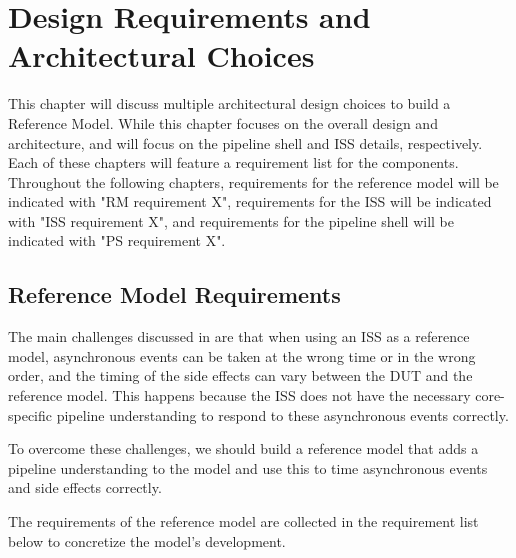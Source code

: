 \chapter{Design Requirements and Architectural Choices}
\label{ch:design}


This chapter will discuss multiple architectural design choices to build a Reference Model. While this chapter focuses on the overall design and architecture,  and  will focus on the pipeline shell and ISS details, respectively. Each of these chapters will feature a requirement list for the components. Throughout the following chapters, requirements for the reference model will be indicated with "RM requirement X", requirements for the ISS will be indicated with "ISS requirement X", and requirements for the pipeline shell will be indicated with "PS requirement X". 

\section{Reference Model Requirements}
\label{sec:rm_req}

The main challenges discussed in  are that when using an ISS as a reference model, asynchronous events can be taken at the wrong time or in the wrong order, and the timing of the side effects can vary between the DUT and the reference model. This happens because the ISS does not have the necessary core-specific pipeline understanding to respond to these asynchronous events correctly.

To overcome these challenges, we should build a reference model that adds a pipeline understanding to the model and use this to time asynchronous events and side effects correctly.

The requirements of the reference model are collected in the requirement list below to concretize the model's development.


